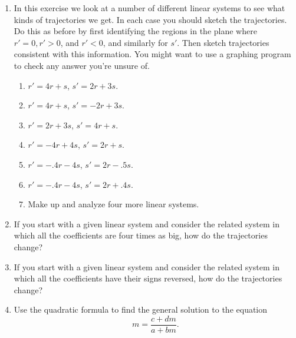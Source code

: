 \begin{enumerate}
\item In this exercise we look at a number of different linear systems
to see what kinds of trajectories we get.  In each case you should
sketch the trajectories.  Do this as before by first identifying the
regions in the plane where $r'=0, r'>0$, and $r'<0$, and similarly for
$s'$.  Then sketch trajectories consistent with this information.  You
might want to use a graphing program to check any answer you're unsure
of.

  \begin{enumerate}
  \item $r' = 4r + s$, \hspace{.25in} $s' = 2r + 3s$.

  \item $r' = 4r + s$, \hspace{.25in} $s' = -2r + 3s$.

  \item $r' = 2r + 3s$, \hspace{.25in} $s' = 4r + s$.

  \item $r' = -4r + 4s$, \hspace{.25in} $s' = 2r + s$.

  \item $r' = -.4r - 4s$, \hspace{.25in} $s' = 2r - .5s$.

  \item $r' = -.4r - 4s$, \hspace{.25in} $s' = 2r + .4s$.

  \item Make up and analyze four more linear systems.


\end{enumerate}
\item If you start with a given linear system and consider the related
system in which all the coefficients are four times as big, how do the
trajectories change?


\item If you start with a given linear system and consider the related
system in which all the coefficients have their signs reversed, how do
the trajectories change?



\item Use the quadratic formula to find the general solution to the
equation
        \[
m=\frac{c+dm}{a+bm}.
\]



\end{enumerate}
